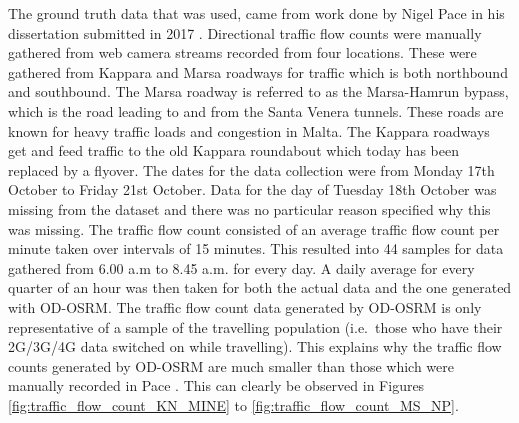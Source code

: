 \documentclass[12pt, a4paper]{report}
\theoremstyle{definition}
\theoremstyle{definition}%
\theoremstyle{definition}%
\theoremstyle{definition}%
\theoremstyle{definition}%
\theoremstyle{definition}%
\begin{document}

The ground truth data that was used, came from work done by Nigel Pace in his dissertation submitted in 2017 \cite{Pace2017}. Directional traffic flow counts were manually gathered from web camera streams recorded from four locations. These were gathered from Kappara and Marsa roadways for traffic which is both northbound and southbound. The Marsa roadway is referred to as the Marsa-Hamrun bypass, which is the road leading to and from the Santa Venera tunnels. These roads are known for heavy traffic loads and congestion in Malta. The Kappara roadways get and feed traffic to the old Kappara roundabout which today has been replaced by a flyover. The dates for the data collection were from Monday 17th October to Friday 21st October. Data for the day of Tuesday 18th October was missing from the dataset and there was no particular reason specified why this was missing. The traffic flow count consisted of an average traffic flow count per minute taken over intervals of 15 minutes. This resulted into 44 samples for data gathered from 6.00 a.m to 8.45 a.m. for every day. A daily average for every quarter of an hour was then taken for both the actual data and the one generated with OD-OSRM. The traffic flow count data generated by OD-OSRM is only representative of a sample of the travelling population (i.e.\ those who have their 2G/3G/4G data switched on while travelling). This explains why the traffic flow counts generated by OD-OSRM are much smaller than those which were manually recorded in Pace \cite{Pace2017}. This can clearly be observed in Figures \ref{fig:traffic_flow_count_KN_MINE} to \ref{fig:traffic_flow_count_MS_NP}.   


\end{document}
